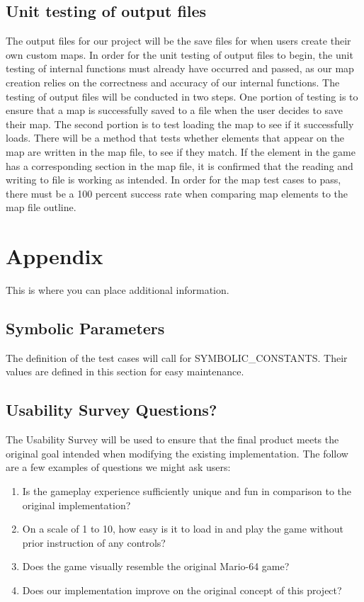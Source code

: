 \documentclass[12pt, titlepage]{article}
\begin{document}
\subsection{Unit testing of output files}		
    The output files for our project will be the save files for when users create their own custom maps. In order for the unit testing of output files to begin, the unit testing of internal functions must already have occurred and passed, as our map creation relies on the correctness and accuracy of our internal functions. The testing of output files will be conducted in two steps. One portion of testing is to ensure that a map is successfully saved to a file when the user decides to save their map. The second portion is to test loading the map to see if it successfully loads. There will be a method that tests whether elements that appear on the map are written in the map file, to see if they match. If the element in the game has a corresponding section in the map file, it is confirmed that the reading and writing to file is working as intended. In order for the map test cases to pass, there must be a 100 percent success rate when comparing map elements to the map file outline.




\newpage

\section{Appendix}

This is where you can place additional information.

\subsection{Symbolic Parameters}

The definition of the test cases will call for SYMBOLIC\_CONSTANTS.
Their values are defined in this section for easy maintenance.

\subsection{Usability Survey Questions?}

\color{Red}

The Usability Survey will be used to ensure that the final product meets the original goal intended when modifying the existing implementation. The follow are a few examples of questions we might ask users:
\begin{enumerate}
    \item Is the gameplay experience sufficiently unique and fun in comparison to the original implementation?
    \item On a scale of 1 to 10, how easy is it to load in and play the game without prior instruction of any controls?
    \item Does the game visually resemble the original Mario-64 game?
    \item Does our implementation improve on the original concept of this project?
\end{enumerate}

\color{Black}
\end{document}
